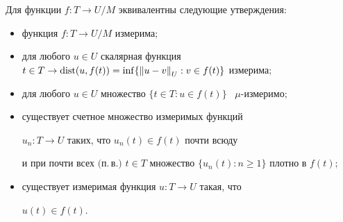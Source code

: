 \begin{lems} \label{lmeas}


Для функции $f:T \to U/M$ эквивалентны следующие утверждения\/${:}$


\begin{itemize}


\item[(i)] функция $f:T \to U/M$ измерима$;$


\item[(ii)] для любого $u \in U$ скалярная функция $t \in T \to


\dist(u, f(t)) = \inf \{ {\|u-v\|}_U: v \in f(t) \}$ измерима$;$


\item[(iii)] для любого $u \in U$ множество $\{t \in T: u \in


f(t)\}$ \ $\mu$-измеримо$;$


\item[(iv)] существует счетное множество измеримых функций


$u_n:T \to U$ таких, что $u_n(t) \in f(t)$ почти всюду


и при почти всех $($п.\,в.$)$ $t


\in T$ множество $\{u_n(t): n \ge 1\}$ плотно в $f(t);$


\item[(v)] существует измеримая функция $u:T \to U$ такая, что


$u(t) \in f(t)$.


\end{itemize}


\end{lems}





